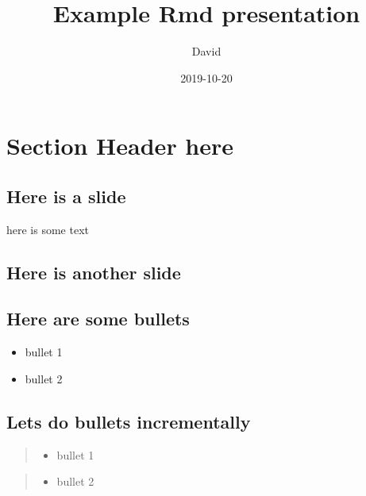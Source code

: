 \documentclass[]{article}
\title{Example Rmd presentation}
\author{David}
\date{2019-10-20}
\providecommand{\tightlist}{%
  \setlength{\itemsep}{0pt}\setlength{\parskip}{0pt}}
\begin{document}
\maketitle

\hypertarget{section-header-here}{%
\section{Section Header here}\label{section-header-here}}

\hypertarget{here-is-a-slide}{%
\subsection{Here is a slide}\label{here-is-a-slide}}

here is some text

\hypertarget{here-is-another-slide}{%
\subsection{Here is another slide}\label{here-is-another-slide}}

\hypertarget{here-are-some-bullets}{%
\subsection{Here are some bullets}\label{here-are-some-bullets}}

\begin{itemize}
\item
  bullet 1
\item
  bullet 2
\end{itemize}

\hypertarget{lets-do-bullets-incrementally}{%
\subsection{Lets do bullets
incrementally}\label{lets-do-bullets-incrementally}}

\begin{quote}
\begin{itemize}
\tightlist
\item
  bullet 1
\end{itemize}
\end{quote}

\begin{quote}
\begin{itemize}
\tightlist
\item
  bullet 2
\end{itemize}
\end{quote}
\end{document}
